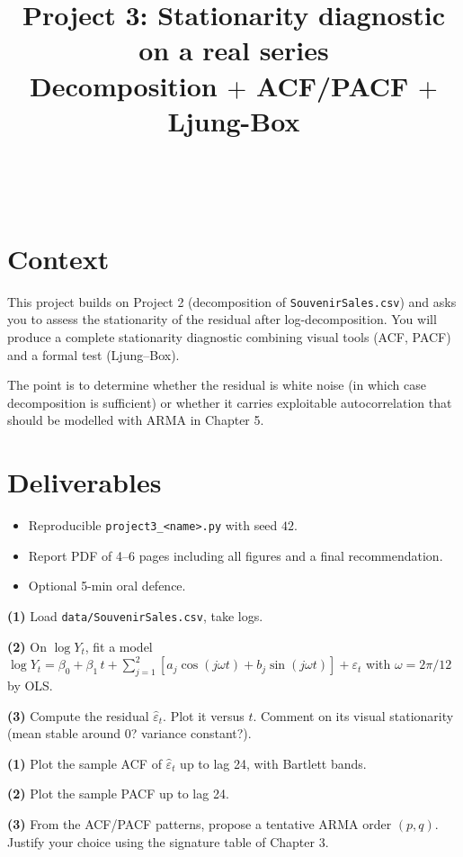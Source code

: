 \documentclass[a4paper,11pt]{article}
\title{Project 3: Stationarity diagnostic on a real series\\
\large Decomposition $+$ ACF/PACF $+$ Ljung-Box}
\author{\auteurNom\\\auteurEmail\\\auteurInstitution}
\date{\anneeUniversitaire}
\begin{document}
\maketitle

\section*{Context}

This project builds on Project 2 (decomposition of \texttt{SouvenirSales.csv})
and asks you to assess the stationarity of the residual after
log-decomposition. You will produce a complete stationarity diagnostic
combining visual tools (ACF, PACF) and a formal test (Ljung--Box).

The point is to determine whether the residual is white noise (in
which case decomposition is sufficient) or whether it carries
exploitable autocorrelation that should be modelled with ARMA in
Chapter 5.

\section*{Deliverables}
\begin{itemize}
  \item Reproducible \texttt{project3\_<name>.py} with seed $42$.
  \item Report PDF of 4--6 pages including all figures and a final
        recommendation.
  \item Optional 5-min oral defence.
\end{itemize}

\begin{exercise}
\textbf{(1)} Load \texttt{data/SouvenirSales.csv}, take logs.

\textbf{(2)} On $\log Y_t$, fit a model
$\log Y_t = \beta_0 + \beta_1\,t + \sum_{j=1}^{2}[a_j \cos(j\omega t)
+ b_j \sin(j\omega t)] + \varepsilon_t$ with $\omega = 2\pi / 12$ by OLS.

\textbf{(3)} Compute the residual $\widehat\varepsilon_t$. Plot it
versus $t$. Comment on its visual stationarity (mean stable around
$0$? variance constant?).
\end{exercise}

\begin{exercise}
\textbf{(1)} Plot the sample ACF of $\widehat\varepsilon_t$ up to lag
24, with Bartlett bands.

\textbf{(2)} Plot the sample PACF up to lag 24.

\textbf{(3)} From the ACF/PACF patterns, propose a tentative ARMA
order $(p, q)$. Justify your choice using the signature table of
Chapter 3.
\end{exercise}
\end{document}
